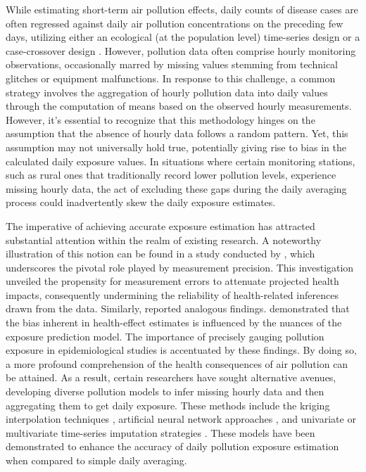 \documentclass[
  12,
]{article}
\begin{document}
While estimating short-term air pollution effects, daily counts of
disease cases are often regressed against daily air pollution
concentrations on the preceding few days, utilizing either an ecological
(at the population level) time-series design \autocites[see
e.g.,][]{Zhou2021,Krall2013,Gouveia2000} or a case-crossover design
\autocites[see
e.g.,][]{Blangiardo2023,Lavigne2022,Liu2019,Di2017,Wing2017}. However,
pollution data often comprise hourly monitoring observations,
occasionally marred by missing values stemming from technical glitches
or equipment malfunctions. In response to this challenge, a common
strategy involves the aggregation of hourly pollution data into daily
values through the computation of means based on the observed hourly
measurements. However, it's essential to recognize that this methodology
hinges on the assumption that the absence of hourly data follows a
random pattern. Yet, this assumption may not universally hold true,
potentially giving rise to bias in the calculated daily exposure values.
In situations where certain monitoring stations, such as rural ones that
traditionally record lower pollution levels, experience missing hourly
data, the act of excluding these gaps during the daily averaging process
could inadvertently skew the daily exposure estimates.

The imperative of achieving accurate exposure estimation has attracted
substantial attention within the realm of existing research. A
noteworthy illustration of this notion can be found in a study conducted
by \textcite{Butland2019}, which underscores the pivotal role played by
measurement precision. This investigation unveiled the propensity for
measurement errors to attenuate projected health impacts, consequently
undermining the reliability of health-related inferences drawn from the
data. Similarly, \textcite{huang2016glaphd} reported analogous findings.
\textcite{Cefalu2014} demonstrated that the bias inherent in
health-effect estimates is influenced by the nuances of the exposure
prediction model. The importance of precisely gauging pollution exposure
in epidemiological studies is accentuated by these findings. By doing
so, a more profound comprehension of the health consequences of air
pollution can be attained. As a result, certain researchers have sought
alternative avenues, developing diverse pollution models to infer
missing hourly data and then aggregating them to get daily exposure.
These methods include the kriging interpolation techniques \autocite[see
e.g.,][]{Cressie1993}, artificial neural network approaches
\autocite[see e.g.,][]{Cordova2021}, and univariate or multivariate
time-series imputation strategies \autocite[see e.g.,][]{Hadeed2020}.
These models have been demonstrated to enhance the accuracy of daily
pollution exposure estimation when compared to simple daily averaging.
\end{document}

